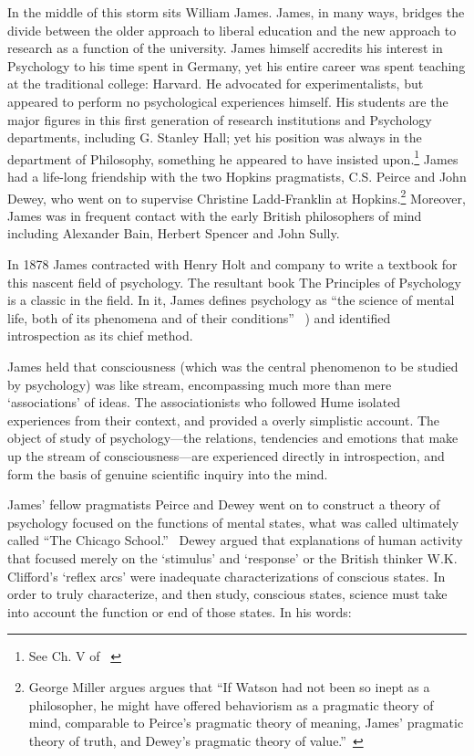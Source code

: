 \begin{refsection}
In the middle of this storm sits William James. James, in many ways, bridges the divide between the older approach to liberal education and the new approach to research as a function of the university. James himself accredits his interest in Psychology to his time spent in Germany, yet his entire career was spent teaching at the traditional college: Harvard. He advocated for experimentalists, but appeared to perform no psychological experiences himself. His students are the major figures in this first generation of research institutions and Psychology departments, including G. Stanley Hall; yet his position was always in the department of Philosophy, something he appeared to have insisted upon.\footnote{See Ch. V of ~\citep{Miller:1962vk}} James had a life-long friendship with the two Hopkins pragmatists, C.S. Peirce and John Dewey, who went on to supervise Christine Ladd-Franklin at Hopkins.\footnote{George Miller argues argues that “If Watson had not been so inept as a philosopher, he might have offered behaviorism as a pragmatic theory of mind, comparable to Peirce’s pragmatic theory of meaning, James’ pragmatic theory of truth, and Dewey’s pragmatic theory of value.”~\citep[p. 66]{Miller:1962vk}} Moreover, James was in frequent contact with the early British philosophers of mind including Alexander Bain, Herbert Spencer and John Sully. 

In 1878 James contracted with Henry Holt and company to write a textbook for this nascent field of psychology. The resultant book The Principles of Psychology is a classic in the field. In it, James defines psychology as “the science of mental life, both of its phenomena and of their conditions” ~\citep[p. 1]{James:1890wm}) and identified introspection as its chief method.

James held that consciousness (which was the central phenomenon to be studied by psychology) was like stream, encompassing much more than mere ‘associations’ of ideas. The associationists who followed Hume isolated experiences from their context, and provided a overly simplistic account. The object of study of psychology---the relations, tendencies and emotions that make up the stream of consciousness---are experienced directly in introspection, and form the basis of genuine scientific inquiry into the mind.

James' fellow pragmatists Peirce and Dewey went on to construct a theory of psychology focused on the functions of mental states, what was called ultimately called “The Chicago School.”~\citep{James:1904dz} Dewey argued that explanations of human activity that focused merely on the `stimulus' and `response' or the British thinker W.K. Clifford’s ‘reflex arcs' were inadequate characterizations of conscious states. In order to truly characterize, and then study, conscious states, science must take into account the function or end of those states. In his words:


\end{refsection}

